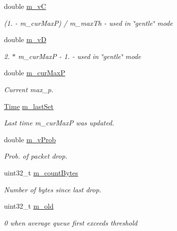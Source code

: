 \begin{DoxyCompactItemize}
double \hyperlink{classns3_1_1RedQueueDisc_ae06b2dbe2b79013c1b7682bbda4fd182}{m\+\_\+vC}
\begin{DoxyCompactList}\small\item\em (1. -\/ m\+\_\+cur\+MaxP) / m\+\_\+max\+Th -\/ used in \char`\"{}gentle\char`\"{} mode \end{DoxyCompactList}\item 
double \hyperlink{classns3_1_1RedQueueDisc_ace5d2581758baa698fc2e5ebe4842026}{m\+\_\+vD}
\begin{DoxyCompactList}\small\item\em 2. $\ast$ m\+\_\+cur\+MaxP -\/ 1. -\/ used in \char`\"{}gentle\char`\"{} mode \end{DoxyCompactList}\item 
double \hyperlink{classns3_1_1RedQueueDisc_af00e660caa4f7360e23b9f667382b1c6}{m\+\_\+cur\+MaxP}
\begin{DoxyCompactList}\small\item\em Current max\+\_\+p. \end{DoxyCompactList}\item 
\hyperlink{classns3_1_1Time}{Time} \hyperlink{classns3_1_1RedQueueDisc_a9ccc3f308a4f15ae970499e7545b360f}{m\+\_\+last\+Set}
\begin{DoxyCompactList}\small\item\em Last time m\+\_\+cur\+MaxP was updated. \end{DoxyCompactList}\item 
double \hyperlink{classns3_1_1RedQueueDisc_aa24ff74b774ceb929bc49fe289fbf31c}{m\+\_\+v\+Prob}
\begin{DoxyCompactList}\small\item\em Prob. of packet drop. \end{DoxyCompactList}\item 
uint32\+\_\+t \hyperlink{classns3_1_1RedQueueDisc_a7bcb375212b9757440dd9cf3e8f1ab5b}{m\+\_\+count\+Bytes}
\begin{DoxyCompactList}\small\item\em Number of bytes since last drop. \end{DoxyCompactList}\item 
uint32\+\_\+t \hyperlink{classns3_1_1RedQueueDisc_a4a559e37f94d5f957a436fdcadd18bbb}{m\+\_\+old}
\begin{DoxyCompactList}\small\item\em 0 when average queue first exceeds threshold \end{DoxyCompactList}\item 

\end{DoxyCompactItemize}
